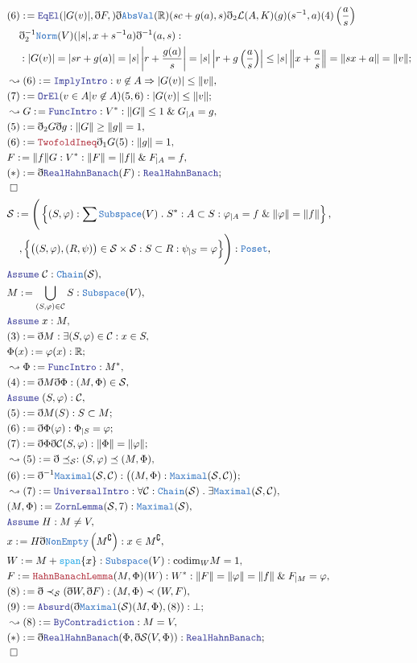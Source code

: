 \documentclass[12pt]{scrartcl}
\newcommand{\TYPE}[1]{\textcolor{NavyBlue}{\mathtt{#1}}}
\newcommand{\FUNC}[1]{\textcolor{Cerulean}{\mathtt{#1}}}
\newcommand{\LOGIC}[1]{\textcolor{Blue}{\mathtt{#1}}}
\newcommand{\THM}[1]{\textcolor{Maroon}{\mathtt{#1}}}
\renewcommand{\.}{\; . \;}
\newcommand{\de}{: \kern 0.1pc =}
\newcommand{\NewLine}{\\ & \kern 1pc}
\newcommand{\Page}[1]{\begin{align*} #1 \end{align*} \newpage   }
\newcommand{ \bd }{ \ByDef }
\renewcommand{\And}{\; \& \;}
\newcommand{\Reals}{\mathbb{R} }
\renewcommand{\c}{\complement}
\newcommand{\Say}[3]{& #1 \de #2 : #3, \\}
\newcommand{\Conclude}[3]{& #1 \de #2 : #3; \\}
\newcommand{\Derive}[3]{& \leadsto #1 \de #2 : #3, \\}
\newcommand{\A}{\LOGIC{Assume} \;}
\newcommand{\Assume}[2]{& \A #1 : #2, \\}
\newcommand{\QED}{\; \square}
\newcommand{\EndProof}{& \QED \\}
\newcommand{\ByDef}{\eth}
\begin{document}
   \Page{
   \Conclude{(6)}{ \LOGIC{EqEl}(|G(v)|, \bd F, )\bd\TYPE{AbsVal}(\Reals)(sc + g(a),s)
     \bd_2 \mathcal{L}(A,K)(g)(s^{-1}, a)(4)\left( \frac{a}{s}  \right)
     \NewLine     
     \bd^{-1}_2 \TYPE{Norm}(V)(|s|,x + s^{-1}a)\bd^{-1} (a,s)   
     }{
    \NewLine :   
    | G(v) | = |sr  +  g(a)  | =  |s|\left|r + \frac{g(a)}{s} \right| 
   =  |s|\left|r + g \left( \frac{a}{s} \right) \right| \le  |s|\left\|  x   + \frac{a}{s}  \right\|
   = \left\| sx  + a \right\| = \| v \|
   }
   \Derive{(6)}{\LOGIC{ImplyIntro}}{ v \not \in A \Rightarrow |G(v)| \le \| v \| }
   \Conclude{(7)}{\LOGIC{OrEl}(v \in A | v \not \in A)(5,6)}{|G(v)| \le \| v \|}
   \Derive{G}{ \LOGIC{FuncIntro}}{  V^*  : \| G \| \le 1 \And G_{|A} = g }
   \Say{(5)}{\bd_2 G \bd g}{ \| G \| \ge \| g \| = 1 }
   \Say{(6)}{ \THM{TwofoldIneq}\bd_1 G  (5) }{ \| g \| = 1 }
   \Say{F}{\| f \|G}{ V^* : \| F \| = \| f \| \And  F_{|A} = f  }
   \Conclude{(*)}{\bd \LOGIC{RealHahnBanach}(F)}{\LOGIC{RealHahnBanach}}
   \EndProof
   \Say{\mathcal{S}}{ \Bigg(
   \left\{ (S,\varphi) : \sum  \TYPE{Subspace}(V) \. S^* : 
     A \subset S : \varphi_{|A} = f \And  \| \varphi  \| = \|  f \|  \right\}   ,
     \NewLine ,
   \Big\{ \big((S,\varphi),(R,\psi)\big) \in \mathcal{S} \times \mathcal{S} : S \subset R : \psi_{|S} = \varphi  \Big\}   
  \Bigg)   
   }{ \TYPE{Poset}}
  \Assume{\mathcal{C}}{\TYPE{Chain}(\mathcal{S})}
  \Say{M}{ \bigcup_{(S,\varphi) \in \mathcal{C}} S }{ \TYPE{Subspace}(V)}
  \Assume{x}{M}
  \Say{(3)}{\bd M}{ \exists (S,\varphi) \in \mathcal{C} : x \in S }
  \Conclude{\Phi(x)}{\varphi(x)}{\Reals}
  \Derive{\Phi}{\LOGIC{FuncIntro}}{M^*}
  \Say{ (4) }{ \bd M \bd \Phi}{(M,\Phi) \in \mathcal{S}}
  \Assume{(S,\varphi)}{\mathcal{C}}
  \Conclude{(5)}{\bd M (S) }{ S \subset M}
  \Conclude{(6)}{ \bd \Phi (\varphi) }{ \Phi_{|S} = \varphi }
  \Conclude{(7)}{ \bd \Phi \bd \mathcal{C}(S,\varphi)}{ \| \Phi \| = \| \varphi \| }
  \Derive{(5)}{\bd \preceq_\mathcal{S}}{ (S,\varphi) \preceq (M,\Phi)}
  \Conclude{(6)}{ \bd^{-1} \TYPE{Maximal}(\mathcal{S}, \mathcal{C}) }{ \big( (M,\Phi) : 
  \TYPE{Maximal}(\mathcal{S}, \mathcal{C}) \big) } 
  \Derive{(7)}{\LOGIC{UniversalIntro}}{\forall \mathcal{C} : \TYPE{Chain}(\mathcal{S}) \.
  \exists \TYPE{Maximal}(\mathcal{S}, \mathcal{C}) }
  \Say{(M,\Phi)}{\LOGIC{ZornLemma}(\mathcal{S},7)}{\TYPE{Maximal}(\mathcal{S})}
  \Assume{H}{M \neq V}
  \Say{x}{ H\bd \TYPE{NonEmpty}\left(M^\c \right)}{ x \in M^\c}
  \Say{W}{M + \FUNC{span}\{x\}}{\TYPE{Subspace}(V) : \mathrm{codim}_W M = 1 }
  \Say{F}{\THM{HahnBanachLemma}(M,\Phi)(W)}{W^* : \| F\| = \| \varphi \| = \| f \| \And F_{|M} = \varphi}
  \Say{(8)}{\bd\prec_\mathcal{S} (\bd W, \bd F) }{ (M,\Phi) \prec (W,F)}
  \Conclude{(9)}{\LOGIC{Absurd}(\bd \TYPE{Maximal}(\mathcal{S})(M,\Phi), (8) ) }{\bot}
  \Derive{(8)}{\LOGIC{ByContradiction}}{ M = V}
  \Conclude{(*)}{ \bd \LOGIC{RealHahnBanach}(\Phi, \bd \mathcal{S}(V,\Phi))}{\LOGIC{RealHahnBanach}}
  \EndProof
  }
\end{document}

